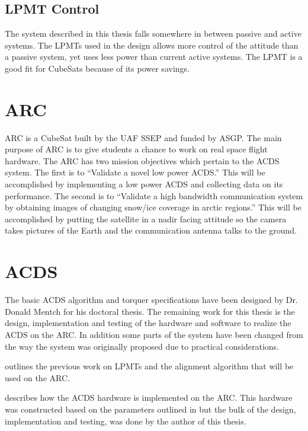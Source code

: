 \subsection{\acl{LPMT} Control}

The system described in this thesis falls somewhere in between passive and active systems. The \acp{LPMT} used in the design allows more control of the attitude than a passive system, yet uses less power than current active systems. The \ac{LPMT} is a good fit for CubeSats because of its power savings.

\section{\acl{ARC}}

\ac{ARC} is a CubeSat built by the \ac{UAF} \ac{SSEP} and funded by \ac{ASGP}. The main purpose of \ac{ARC} is to give students a chance to work on real space flight hardware. The \ac{ARC} has two mission objectives which pertain to the \ac{ACDS} system. The first is to \enquote{Validate a novel low power \ac{ACDS}.}\cite{ARCweb} This will be accomplished by implementing a low power \ac{ACDS} and collecting data on its performance. The second is to \enquote{Validate a high bandwidth communication system by obtaining images of changing snow/ice coverage in arctic regions.}\cite{ARCweb} This will be accomplished by putting the satellite in a nadir facing attitude so the camera takes pictures of the Earth and the communication antenna talks to the ground.

\section{\acl{ACDS}}

The basic \ac{ACDS} algorithm and torquer specifications have been designed by Dr. Donald Mentch for his doctoral thesis\cite{Mentch11}. The remaining work for this thesis is the design, implementation and testing of the hardware and software to realize the \ac{ACDS} on the \ac{ARC}. In addition some parts of the system have been changed from the way the system was originally proposed due to practical considerations.

 outlines the previous work on \acp{LPMT} and the alignment algorithm that will be used on the \ac{ARC}.

 describes how the \ac{ACDS} hardware is implemented on the \ac{ARC}. This hardware was constructed based on the parameters outlined in \cite{Mentch11} but the bulk of the design, implementation and testing, was done by the author of this thesis.

